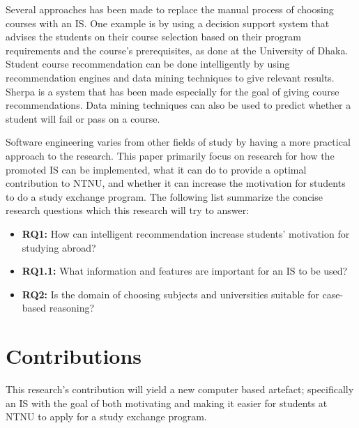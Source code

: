 Several approaches has been made to replace the manual process of choosing courses with an IS. One example is by using a decision support system that advises the students on their course selection based on their program requirements and the course's prerequisites, as done at the University of Dhaka\cite{roushan2014university}. Student course recommendation can be done intelligently by using recommendation engines and data mining techniques to give relevant results. Sherpa\cite{bramucci2012sherpa} is a system that has been made especially for the goal of giving course recommendations. Data mining techniques can also be used to predict whether a student will fail or pass on a course\cite{vialardi2009recommendation}.

Software engineering varies from other fields of study by having a more practical approach to the research. This paper primarily focus on research for how the promoted IS can be implemented,  what it can do to provide a optimal contribution to NTNU, and whether it can increase the motivation for students to do a study exchange program. The following list summarize the concise research questions which this research will try to answer:

\begin{itemize}
    \item \textbf{RQ1:} How can intelligent recommendation increase students' motivation for studying abroad?
    \item \textbf{RQ1.1:} What information and features are important for an IS to be used? 
    \item \textbf{RQ2:} Is the domain of choosing subjects and universities suitable for case-based reasoning?
    
\end{itemize}

\section{Contributions}

This research's contribution will yield a new computer based artefact; specifically an IS with the goal of both motivating and making it easier for students at NTNU to apply for a study exchange program.

